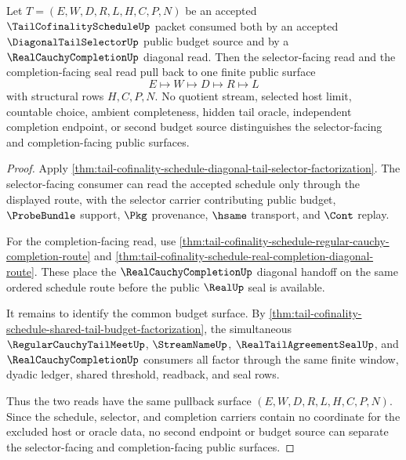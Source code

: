 \begin{theorem}
\label{thm:tail-cofinality-schedule-selector-completion-pullback}
Let $T=(E,W,D,R,L,H,C,P,N)$ be an accepted
$\TailCofinalityScheduleUp$ packet consumed both by an accepted
$\DiagonalTailSelectorUp$ public budget source and by a
$\RealCauchyCompletionUp$ diagonal read. Then the selector-facing read and
the completion-facing seal read pull back to one finite public surface
$$
E \longmapsto W \longmapsto D \longmapsto R \longmapsto L
$$
with structural rows $H,C,P,N$. No quotient stream, selected host limit,
countable choice, ambient completeness, hidden tail oracle, independent
completion endpoint, or second budget source distinguishes the selector-facing
and completion-facing public surfaces.
\end{theorem}
\begin{proof}
Apply
\autoref{thm:tail-cofinality-schedule-diagonal-tail-selector-factorization}.
The selector-facing consumer can read the accepted schedule only through the
displayed route, with the selector carrier contributing public budget,
$\ProbeBundle$ support, $\Pkg$ provenance, $\hsame$ transport, and $\Cont$
replay.

For the completion-facing read, use
\autoref{thm:tail-cofinality-schedule-regular-cauchy-completion-route} and
\autoref{thm:tail-cofinality-schedule-real-completion-diagonal-route}. These
place the $\RealCauchyCompletionUp$ diagonal handoff on the same ordered
schedule route before the public $\RealUp$ seal is available.

It remains to identify the common budget surface. By
\autoref{thm:tail-cofinality-schedule-shared-tail-budget-factorization}, the
simultaneous $\RegularCauchyTailMeetUp$, $\StreamNameUp$,
$\RealTailAgreementSealUp$, and $\RealCauchyCompletionUp$ consumers all factor
through the same finite window, dyadic ledger, shared threshold, readback, and
seal rows.

Thus the two reads have the same pullback surface
$(E,W,D,R,L,H,C,P,N)$. Since the schedule, selector, and completion carriers
contain no coordinate for the excluded host or oracle data, no second endpoint
or budget source can separate the selector-facing and completion-facing
public surfaces.
\end{proof}

